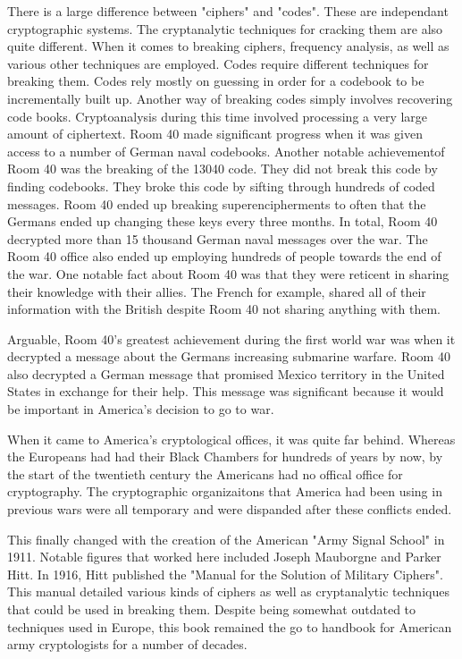 \documentclass{article}
\begin{document}
    There is a large difference between "ciphers" and "codes". These are independant
    cryptographic systems. The cryptanalytic techniques for cracking them are also
    quite different.
    When it comes to breaking ciphers, frequency analysis, as well as various
    other techniques are employed.
    Codes require different techniques for breaking them. Codes rely mostly
    on guessing in order for a codebook to be incrementally built up.
    Another way of breaking codes simply involves recovering code books.
    Cryptoanalysis during this time involved processing a very large amount of
    ciphertext.
    Room 40 made significant progress when it was given access to a number of German
    naval codebooks.
    Another notable achievementof Room 40 was the breaking of the 13040 code.
    They did not break this code by finding codebooks. They broke this code
    by sifting through hundreds of coded messages.
    Room 40 ended up breaking superencipherments to often that the Germans
    ended up changing these keys every three months.
    In total, Room 40 decrypted more than 15 thousand German naval messages
    over the war.
    The Room 40 office also ended up employing hundreds of people towards the
    end of the war.
    One notable fact about Room 40 was that they were reticent in sharing their
    knowledge with their allies. The French for example, shared all of their
    information with the British despite Room 40 not sharing anything with them.

    Arguable, Room 40's greatest achievement during the first world war was when
    it decrypted a message about the Germans increasing submarine warfare.
    Room 40 also decrypted a German message that promised Mexico territory
    in the United States in exchange for their help. This message was significant
    because it would be important in America's decision to go to war.

    When it came to America's cryptological offices, it was quite far behind.
    Whereas the Europeans had had their Black Chambers for hundreds of years by now,
    by the start of the twentieth century the Americans had no offical office
    for cryptography. The cryptographic organizaitons that America had been using
    in previous wars were all temporary and were dispanded after these conflicts ended.

    This finally changed with the creation of the American "Army Signal School" in 1911.
    Notable figures that worked here included Joseph Mauborgne and Parker Hitt.
    In 1916, Hitt published the "Manual for the Solution of Military Ciphers".
    This manual detailed various kinds of ciphers as well as cryptanalytic techniques
    that could be used in breaking them. Despite being somewhat outdated
    to techniques used in Europe, this book remained the go to handbook for American
    army cryptologists for a number of decades.
\end{document}
